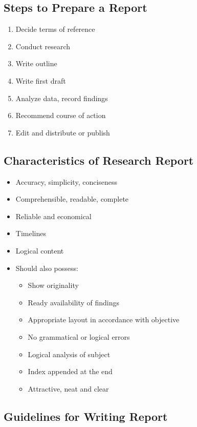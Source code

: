\documentclass{article}
\begin{document}
\subsection{Steps to Prepare a Report}

\begin{enumerate}
    \item Decide terms of reference
    \item Conduct research
    \item Write outline
    \item Write first draft
    \item Analyze data, record findings
    \item Recommend course of action
    \item Edit and distribute or publish
\end{enumerate}

\subsection{Characteristics of Research Report}

\begin{itemize}
    \item Accuracy, simplicity, conciseness
    \item Comprehensible, readable, complete 
    \item Reliable and economical
    \item Timelines
    \item Logical content
    \item Should also possess:
    \begin{itemize}
        \item Show originality
        \item Ready availability of findings
        \item Appropriate layout in accordance with objective
        \item No grammatical or logical errors
        \item Logical analysis of subject
        \item Index appended at the end
        \item Attractive, neat and clear
    \end{itemize}
\end{itemize}

\subsection{Guidelines for Writing Report}
\end{document}

